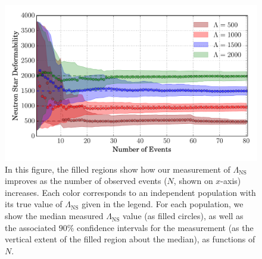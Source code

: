 \documentclass[aps,prd,amsmath,floats,floatfix, twocolumn,
superscriptaddress,nofootinbib,showpacs]{revtex4-1}
\newcommand{\lambdans}{\Lambda_\mathrm{NS}}
\begin{document}
%
%
\begin{figure}
\centering    
\includegraphics[width=1.05\columnwidth]{plots/FillBetweenRelErrorBarsLambda_vs_NShifted_AllLambda.pdf}
\caption{%
In this figure, the filled regions show how our measurement of $\lambdans$
improves as the number of observed events ($N$, shown on $x$-axis) increases.
Each color corresponds to an independent population with its true value of
$\lambdans$ given in the legend. For each population, we show the median 
measured $\lambdans$ value (as filled circles), as well as the associated
$90\%$ confidence intervals for the measurement (as the vertical extent of the
filled region about the median), as functions of $N$.
}
\label{fig:TT_Lambda_vs_N_CI90_0}
\end{figure}
\end{document}
